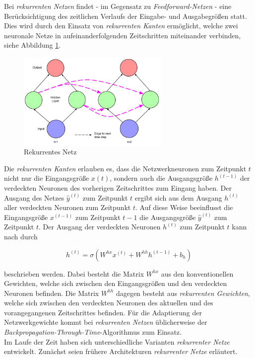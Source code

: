 Bei \textit{rekurrenten Netzen} findet - im Gegensatz zu \textit{Feedforward-Netzen} - eine Berücksichtigung des zeitlichen Verlaufs der Eingabe- und Ausgabegrößen statt. Dies wird durch den Einsatz von \textit{rekurrenten Kanten} ermöglicht, welche zwei neuronale Netze in aufeinanderfolgenden Zeitschritten miteinander verbinden, siehe Abbildung \ref{fig:recurrent}.  

\begin{figure} [h]
	\centering
	\includegraphics[width=0.65\textwidth]{images/recurrent_net}
	\caption{Rekurrentes Netz \cite{Lipton.5292015}}
	\label{fig:recurrent}
\end{figure}

Die \textit{rekurrenten Kanten} erlauben es, dass die Netzwerkneuronen zum Zeitpunkt $t$ nicht nur die Eingangsgröße $x(t)$, sondern auch die Ausgangsgröße $h^{(t-1)}$ der verdeckten Neuronen des vorherigen Zeitschrittes zum Eingang haben. Der Ausgang des Netzes $\hat{y}^{(t)}$ zum Zeitpunkt $t$ ergibt sich aus dem Ausgang $h^{(t)}$ aller verdeckten Neuronen zum Zeitpunkt $t$. Auf diese Weise beeinflusst die Eingangsgröße $x^{(t-1)}$ zum Zeitpunkt $t-1$ die Ausgangsgröße $\hat{y}^{(t)}$ zum Zeitpunkt $t$. Der Ausgang der verdeckten Neuronen $h^{(t)}$ zum Zeitpunkt $t$ kann nach \cite{Lipton.5292015} durch 

\begin{equation}
h^{(t)} = \sigma(W^{hx}x^{(t)} + W^{hh}h^{(t-1)} + b_h)
\end{equation}

beschrieben werden. Dabei besteht die Matrix $W^{hx}$ aus den konventionellen Gewichten, welche sich zwischen den Eingangsgrößen und den verdeckten Neuronen befinden. Die Matrix $W^{hh}$ dagegen besteht aus \textit{rekurrenten Gewichten}, welche sich zwischen den verdeckten Neuronen des aktuellen und des vorangegangenen Zeitschrittes befinden. Für die Adaptierung der Netzwerkgewichte kommt bei \textit{rekurrenten Netzen} üblicherweise der \textit{Backpropagation-Through-Time}-Algorithmus zum Einsatz. \cite{Lipton.5292015} \\ 
Im Laufe der Zeit haben sich unterschiedliche Varianten \textit{rekurrenter Netze} entwickelt. Zunächst seien frühere Architekturen \textit{rekurrenter Netze} erläutert.


